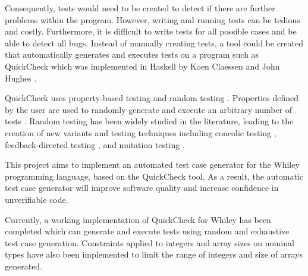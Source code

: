 Consequently, tests would need to be created to detect if there are further problems within the program. However, writing and running tests can be tedious and costly. Furthermore, it is difficult to write tests for all possible cases and be able to detect all bugs. Instead of manually creating tests, a tool could be created that automatically generates and executes tests on a program such as QuickCheck which was implemented in Haskell by Koen Claessen and John Hughes \cite{QClightweight}.

QuickCheck uses property-based testing and random testing \cite{QClightweight}. Properties defined by the user are used to randomly generate and execute an arbitrary number of tests \cite{QClightweight}. 
Random testing has been widely studied in the literature, leading to the creation of new variants and testing techniques including concolic testing \cite{CUTE}, feedback-directed testing \cite{randoopAll}, \cite{randoopJava} and mutation testing \cite{evoSuite}.


This project aims to implement an automated test case generator for the Whiley programming language, based on the QuickCheck tool. As a result, the automatic test case generator will improve software quality and increase confidence in unverifiable code. 

Currently, a working implementation of QuickCheck for Whiley has been completed which can generate and execute tests using random and exhaustive test case generation. 
Constraints applied to integers and array sizes on nominal types have also been implemented to limit the range of integers and size of arrays generated.

